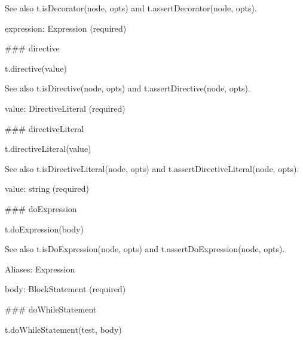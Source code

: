 See also {\ttfamily t.\+is\+Decorator(node, opts)} and {\ttfamily t.\+assert\+Decorator(node, opts)}.


\begin{DoxyItemize}
\item {\ttfamily expression}\+: {\ttfamily Expression} (required) 


\end{DoxyItemize}

\#\#\# directive 
\begin{DoxyCode}
t.directive(value)
\end{DoxyCode}


See also {\ttfamily t.\+is\+Directive(node, opts)} and {\ttfamily t.\+assert\+Directive(node, opts)}.


\begin{DoxyItemize}
\item {\ttfamily value}\+: {\ttfamily Directive\+Literal} (required) 


\end{DoxyItemize}

\#\#\# directive\+Literal 
\begin{DoxyCode}
t.directiveLiteral(value)
\end{DoxyCode}


See also {\ttfamily t.\+is\+Directive\+Literal(node, opts)} and {\ttfamily t.\+assert\+Directive\+Literal(node, opts)}.


\begin{DoxyItemize}
\item {\ttfamily value}\+: {\ttfamily string} (required) 


\end{DoxyItemize}

\#\#\# do\+Expression 
\begin{DoxyCode}
t.doExpression(body)
\end{DoxyCode}


See also {\ttfamily t.\+is\+Do\+Expression(node, opts)} and {\ttfamily t.\+assert\+Do\+Expression(node, opts)}.

Aliases\+: {\ttfamily Expression}


\begin{DoxyItemize}
\item {\ttfamily body}\+: {\ttfamily Block\+Statement} (required) 


\end{DoxyItemize}

\#\#\# do\+While\+Statement 
\begin{DoxyCode}
t.doWhileStatement(test, body)
\end{DoxyCode}


